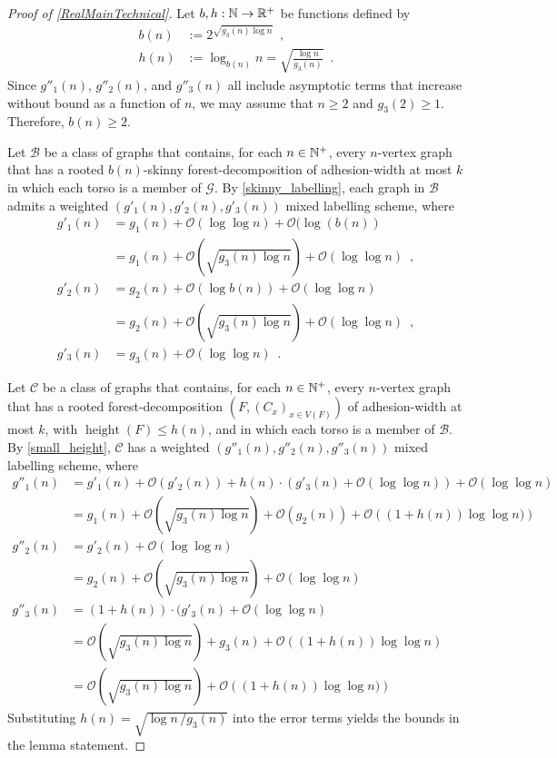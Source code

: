 \documentclass{patmorin}
\renewcommand{\ge}{\geqslant}
\renewcommand{\leq}{\leqslant}
\DeclareMathOperator{\height}{height}
\newcommand{\Oh}{\mathcal{O}}
\begin{document}
  \begin{proof}[Proof of \cref{RealMainTechnical}]
    Let $b,h:\mathbb{N}\to\mathbb{R}^+$ be functions defined by
    \begin{align*}
      b(n) &:=2^{\sqrt{g_3(n)\log n}}\enspace,\\
      h(n) &:= \log_{b(n)}n = \sqrt{\frac{\log n}{g_3(n)}} \enspace .
    \end{align*}
    Since $g''_1(n)$, $g''_2(n)$, and $g''_3(n)$ all include asymptotic terms that increase without bound as a function of $n$, we may assume that $n\ge 2$ and $g_3(2)\ge 1$.  Therefore, $b(n)\ge 2$.


    Let $\mathcal{B}$ be a class of graphs that contains, for each $n\in\mathbb{N}^+$, every $n$-vertex graph that has a rooted $b(n)$-skinny forest-decomposition of adhesion-width at most $k$ in which each torso is a member of $\mathcal{G}$.
    By \cref{skinny_labelling}, each graph in $\mathcal{B}$ admits a
    weighted $(g'_1(n),g'_2(n),g'_3(n))$ mixed labelling scheme, where
    \begin{align*}
     g'_1(n) & = g_1(n) + \Oh(\log\log n) + \Oh(\log(b(n))\\
     & = g_1(n) + \Oh\left(\sqrt{g_3(n) \log n}\right) + \Oh(\log\log n)\enspace, \\
     g'_2(n) & = g_2(n)+ \Oh(\log b(n))+\Oh(\log\log n)\\
          & = g_2(n) + \Oh\left(\sqrt{g_3(n) \log n}\right) + \Oh(\log\log n)\enspace, \\
     g'_3(n) & = g_3(n) + \Oh(\log\log n)\enspace.
    \end{align*}

    Let $\mathcal{C}$ be a class of graphs that contains, for each $n\in\mathbb{N}^+$,
    every $n$-vertex graph that has a rooted forest-decomposition $(F,(C_x)_{x\in V(F)})$
    of adhesion-width at most $k$, with $\height(F)\leq h(n)$, and
    in which each torso is a member of $\mathcal{B}$.
    By \cref{small_height}, $\mathcal{C}$ has a weighted \linebreak $(g''_1(n),g''_2(n),g''_3(n))$ mixed labelling scheme, where
    \begin{align*}
     g''_1(n) & = g'_1(n) + \Oh(g'_2(n)) + h(n)\cdot (g'_3(n)+\Oh(\log\log n)) + \Oh(\log\log n) \\
       & = g_1(n) +  \Oh\left(\sqrt{g_3(n) \log n}\right) + \Oh(g_2(n)) + \Oh\left((1+h(n))\log\log n)\right) \\
     g''_2(n) & = g'_2(n) + \Oh(\log\log n) \\
       & = g_2(n) + \Oh\left(\sqrt{{g_3(n)\log n}}\right) + \Oh(\log\log n) \\
     g''_3(n) & = (1+h(n))\cdot (g'_3(n)+\Oh(\log\log n)\\%
       & = \Oh\left(\sqrt{g_3(n)\log n}\right) + g_3(n) + \Oh\left((1+h(n))\log\log n\right) \\
       & = \Oh\left(\sqrt{g_3(n) \log n}\right) + \Oh\left((1+h(n))\log\log n)\right)
   \end{align*}
   Substituting $h(n) = \sqrt{\log n\, / g_3(n)}$ into the error terms yields the bounds in the lemma statement.


\end{proof}
\end{document}

